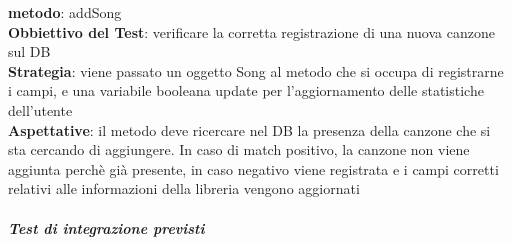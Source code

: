 \begin{itemize}
\textbf{metodo}: addSong\\
\textbf{Obbiettivo del Test}: verificare la corretta registrazione di una nuova
canzone sul DB\\
\textbf{Strategia}: viene passato un oggetto Song al metodo che si occupa di
registrarne i campi, e una variabile booleana update per l'aggiornamento delle
statistiche dell'utente\\
\textbf{Aspettative}: il metodo deve ricercare nel DB
la presenza della canzone che si sta cercando di aggiungere. In caso di match positivo, la canzone non viene aggiunta perch\`e gi\`a presente, in caso negativo viene registrata e i
campi corretti relativi alle informazioni della libreria vengono aggiornati\\

\end{itemize}

\subparagraph{Test di integrazione previsti}

